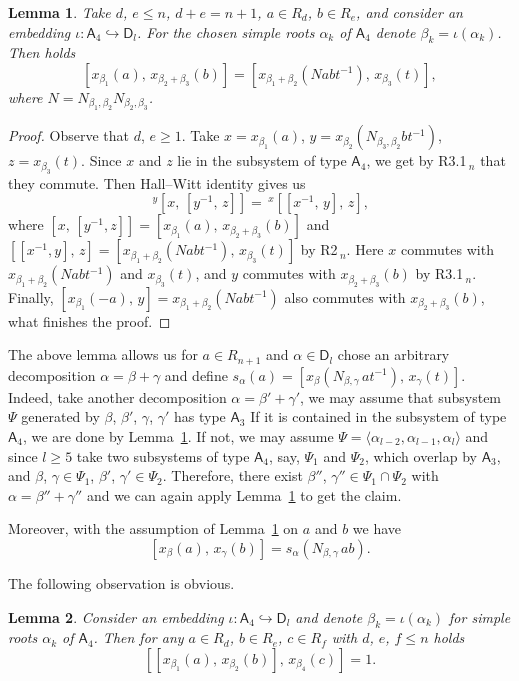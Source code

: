 \documentclass[oneside, 8pt]{amsart}
\newtheorem{lemma}{Lemma}
\theoremstyle{remark}
\theoremstyle{definition}
\newcommand{\inv}{^{-1}}
\newcommand{\rA}{\mathsf{A}}
\newcommand{\rD}{\mathsf{D}}
\numberwithin{equation}{section}
\begin{document}
\begin{lemma}
\label{welldef}
Take $d$, $e\leq n$, $d+e=n+1$, $a\in R_d$, $b\in R_e$, and consider an embedding $\iota\colon\rA_4\hookrightarrow\rD_l$. For the chosen simple roots $\alpha_k$ of $\rA_4$ denote $\beta_k=\iota(\alpha_k)$. Then holds
\[ [x_{\beta_1}(a),\,x_{\beta_2+\beta_3}(b)]=[x_{\beta_1+\beta_2}(Nabt\inv),\,x_{\beta_3}(t)], \]
where $N=N_{\beta_1,\beta_2}N_{\beta_2,\beta_3}$.
\end{lemma}
\begin{proof}
Observe that $d$, $e\geq1$. Take $x=x_{\beta_1}(a)$, $y=x_{\beta_2}(N_{\beta_3,\beta_2}bt\inv)$, $z=x_{\beta_3}(t)$. Since $x$ and $z$ lie in the subsystem of type $\rA_4$, we get by R3.1$\!\,_n$ that they commute. Then Hall--Witt identity gives us
\[ \,^y[x,\,[y\inv,\,z]]=\,^x[[x\inv,\,y],\,z], \]
where $[x,\,[y\inv,z]]=[x_{\beta_1}(a),\,x_{\beta_2+\beta_3}(b)]$ and $[[x\inv,y],\,z]=[x_{\beta_1+\beta_2}(Nabt\inv),\,x_{\beta_3}(t)]$ by R2$\!\,_n$. Here $x$ commutes with $x_{\beta_1+\beta_2}(Nabt\inv)$ and $x_{\beta_3}(t)$, and $y$ commutes with $x_{\beta_2+\beta_3}(b)$ by R3.1$\!\,_n$. Finally, $[x_{\beta_1}(-a),\,y]=x_{\beta_1+\beta_2}(Nabt\inv)$ also commutes with $x_{\beta_2+\beta_3}(b)$, what finishes the proof.
\end{proof}

The above lemma allows us for $a\in R_{n+1}$ and $\alpha\in\rD_l$ chose an arbitrary decomposition $\alpha=\beta+\gamma$ and define $s_\alpha(a)=[x_\beta(N_{\beta,\gamma}\,at\inv),\,x_\gamma(t)]$. Indeed, take another decomposition $\alpha=\beta'+\gamma'$, we may assume that subsystem $\Psi$ generated by $\beta$, $\beta'$, $\gamma$, $\gamma'$ has type $\rA_3$ If it is contained in the subsystem of type $\rA_4$, we are done by Lemma~\ref{welldef}. If not, we may assume $\Psi=\langle\alpha_{l-2},\alpha_{l-1},\alpha_l\rangle$ and since $l\geq5$ take two subsystems of type $\rA_4$, say, $\Psi_1$ and $\Psi_2$, which overlap by $\rA_3$, and $\beta$, $\gamma\in\Psi_1$, $\beta'$, $\gamma'\in\Psi_2$. Therefore, there exist $\beta''$, $\gamma''\in\Psi_1\cap\Psi_2$ with $\alpha=\beta''+\gamma''$ and we can again apply Lemma~\ref{welldef} to get the claim. 

Moreover, with the assumption of Lemma~\ref{welldef} on $a$ and $b$ we have
\[ [x_{\beta}(a),\,x_{\gamma}(b)]=s_{\alpha}(N_{\beta,\gamma}\,ab). \]

The following observation is obvious.
\begin{lemma} \label{commute}
Consider an embedding $\iota\colon\rA_4\hookrightarrow\rD_l$ and denote $\beta_k=\iota(\alpha_k)$ for simple roots $\alpha_k$ of $\rA_4$. Then for any $a\in R_d$, $b\in R_e$, $c\in R_f$ with $d$, $e$, $f\leq n$ holds
\[ [[x_{\beta_1}(a),\,x_{\beta_2}(b)],\,x_{\beta_4}(c)]=1. \]
\end{lemma}
\end{document}
